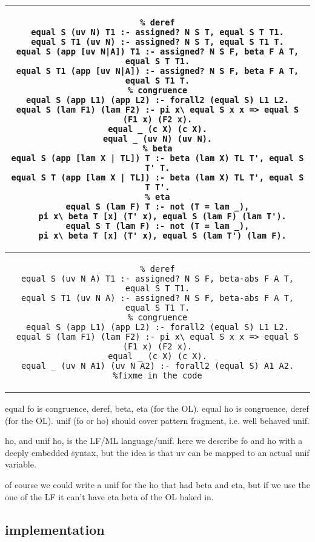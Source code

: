 \documentclass{rapport}
\begin{document}
\noindent
\begin{tabular}{c}
\begin{minipage}{.95\textwidth}
\begin{verbatim}
% deref
equal S (uv N) T1 :- assigned? N S T, equal S T T1.
equal S T1 (uv N) :- assigned? N S T, equal S T1 T.
equal S (app [uv N|A]) T1 :- assigned? N S F, beta F A T, equal S T T1.
equal S T1 (app [uv N|A]) :- assigned? N S F, beta F A T, equal S T1 T.
% congruence
equal S (app L1) (app L2) :- forall2 (equal S) L1 L2.
equal S (lam F1) (lam F2) :- pi x\ equal S x x => equal S (F1 x) (F2 x).
equal _ (c X) (c X).
equal _ (uv N) (uv N).
% beta
equal S (app [lam X | TL]) T :- beta (lam X) TL T', equal S T' T.
equal S T (app [lam X | TL]) :- beta (lam X) TL T', equal S T T'.
% eta
equal S (lam F) T :- not (T = lam _),
  pi x\ beta T [x] (T' x), equal S (lam F) (lam T').
equal S T (lam F) :- not (T = lam _),
  pi x\ beta T [x] (T' x), equal S (lam T') (lam F).
\end{verbatim}
\end{minipage}
\\\hline
\begin{minipage}{.95\textwidth}
\begin{verbatim}
% deref
equal S (uv N A) T1 :- assigned? N S F, beta-abs F A T, equal S T T1.
equal S T1 (uv N A) :- assigned? N S F, beta-abs F A T, equal S T1 T.
% congruence
equal S (app L1) (app L2) :- forall2 (equal S) L1 L2.
equal S (lam F1) (lam F2) :- pi x\ equal S x x => equal S (F1 x) (F2 x).
equal _ (c X) (c X).
equal _ (uv N A1) (uv N A2) :- forall2 (equal S) A1 A2. %fixme in the code
\end{verbatim}
\end{minipage}

\end{tabular}

equal fo is congruence, deref, beta, eta (for the OL).
equal ho is congruence, deref (for the OL).
unif (fo or ho) should cover pattern fragment, i.e. well behaved unif.

ho, and unif ho, is the LF/ML language/unif. here we describe fo and ho
with a deeply embedded syntax, but the idea is that uv can be mapped to
an actual unif variable.

of course we could write a unif for the ho that had beta and eta,
but if we use the one of the LF it can't have eta beta of the OL baked in.

\subsection{implementation}
\end{document}
